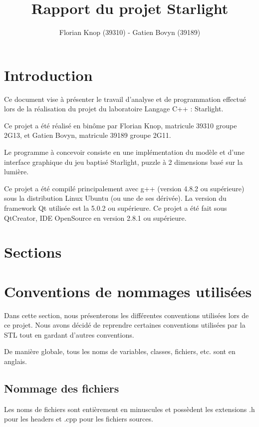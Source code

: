 \documentclass[]{article}
\title{Rapport du projet Starlight}
\author{Florian Knop (39310) - Gatien Bovyn (39189)}
\begin{document}
\maketitle

\newpage

\tableofcontents

\newpage

\section{Introduction}


Ce document vise à présenter le travail d’analyse et de programmation effectué
lors de la réalisation du projet du laboratoire Langage C++ : Starlight.

Ce projet a été réalisé en binôme par Florian Knop, matricule 39310 groupe 2G13,
et Gatien Bovyn, matricule 39189 groupe 2G11.

Le programme à concevoir consiste en une implémentation du modèle et d’une interface
graphique du jeu baptisé Starlight, puzzle à 2 dimensions basé sur la lumière.

Ce projet a été compilé principalement avec g++
(version 4.8.2 ou supérieure)
sous la distribution Linux Ubuntu (ou une de ses dérivée).
La version du framework Qt utilisée est la 5.0.2 ou supérieure.
Ce projet a été fait sous QtCreator, IDE OpenSource en version 2.8.1 ou
supérieure.

\section{Sections}

\section{Conventions de nommages utilisées}

Dans cette section, nous présenterons les différentes conventions 
utilisées lors de ce projet. Nous avons décidé de reprendre certaines
conventions utilisées par la STL tout en gardant d'autres conventions.

De manière globale, tous les noms de variables, classes, fichiers, etc.
sont en anglais.

\subsection{Nommage des fichiers}

Les noms de fichiers sont entièrement en minuscules
et possèdent les extensions .h
pour les headers et .cpp pour les fichiers sources.
\end{document}
